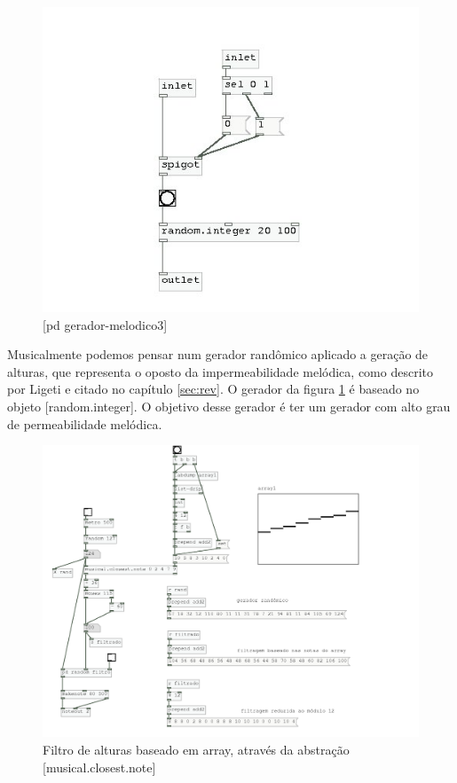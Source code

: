 \documentclass{ppgmus}
\begin{document}


\begin{figure}
\includegraphics[scale=.6]{gera-melodico3}
\caption{[pd gerador-melodico3]}
\label{gera-melodico3}
\end{figure}  

Musicalmente podemos pensar num gerador randômico aplicado a geração de alturas, 
que representa o oposto da impermeabilidade melódica, como descrito por Ligeti e citado
no capítulo \ref{sec:rev}.
O gerador da figura \ref{gera-melodico3} é baseado no 
objeto [random.integer]. O objetivo desse gerador é 
ter um gerador com alto grau de permeabilidade melódica.

\begin{figure}
\includegraphics[scale=.6]{filtro-alturas}
\caption{Filtro de alturas baseado em array, através da abstração [musical.closest.note]}
\label{filtro-alturas}
\end{figure}  
\end{document}
